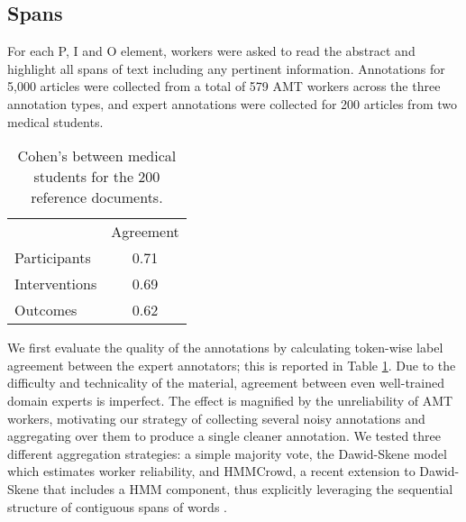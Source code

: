 \documentclass[11pt,a4paper]{article}
\begin{document}
\subsection{Spans}
\label{section:corpus-spans}
For each P, I and O element, workers were asked to read the abstract and highlight all spans of text including any pertinent information. Annotations for 5,000 articles were collected from a total of 579 AMT workers across the three annotation types, and expert annotations were collected for 200 articles from two medical students. 

\begin{table}[h]\centering
    \small
    \begin{tabular}{ l c } 
& Agreement \\
         \cline{2-2}
         Participants & 0.71 \\
         Interventions & 0.69 \\
         Outcomes & 0.62 \\
\end{tabular}
    \caption{Cohen's  between medical students for the 200 reference documents.}
     \label{tab:span_agreement}
\end{table}

We first evaluate the quality of the annotations by calculating token-wise label agreement between the expert annotators; this is reported in Table \ref{tab:span_agreement}.
Due to the difficulty and technicality of the material, agreement between even well-trained domain experts is imperfect.
The effect is magnified by the unreliability of AMT workers, motivating our strategy of collecting several noisy annotations and aggregating over them to produce a single cleaner annotation.
We tested three different aggregation strategies: a simple majority vote, the Dawid-Skene model \cite{dawid1979maximum} which estimates worker reliability, 
and HMMCrowd, a recent extension to Dawid-Skene that includes a HMM component, thus explicitly leveraging the sequential structure of contiguous spans of words \citep{nguyen2017aggregating}.
\end{document}
